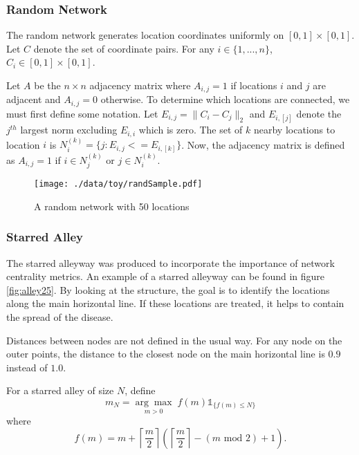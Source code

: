 \documentclass[11pt]{article}
\begin{document}
\subsubsection{Random Network}
\label{sec-2-1-1}

The random network generates location coordinates uniformly on $[0,1]
\times [0,1]$.  Let $C$ denote the set of coordinate pairs.  For any
$i \in \lbrace 1,...,n \rbrace$, $C_{i} \in [0,1] \times [0,1]$.

Let $A$ be the $n \times n$ adjacency matrix where $A_{i,j} = 1$ if
locations $i$ and $j$ are adjacent and $A_{i,j} = 0$ otherwise.  To
determine which locations are connected, we must first define some
notation.  Let $E_{i,j} = \|C_{i} - C_{j}\|_2$ and $E_{i,[j]}$ denote
the $j^{th}$ largest norm excluding $E_{i,i}$ which is zero.  The set
of $k$ nearby locations to location $i$ is $N^{(k)}_i = \lbrace j :
E_{i,j} <= E_{i,[k]} \rbrace$.  Now, the adjacency matrix is defined
as $A_{i,j} = 1$ if $i \in N_{j}^{(k)}$ or $j \in N_{i}^{(k)}$.


\begin{figure}[htb]
\centering
\texttt{[image: ./data/toy/randSample.pdf]}
\caption{\label{fig:rand25}A random network with 50 locations}
\end{figure}



\subsubsection{Starred Alley}
\label{sec-2-1-2}

The starred alleyway was produced to incorporate the importance of
network centrality metrics.  An example of a starred alleyway can be
found in figure \ref{fig:alley25}.  By looking at the structure, the goal is
to identify the locations along the main horizontal line.  If these
locations are treated, it helps to contain the spread of the disease.

Distances between nodes are not defined in the usual way.  For any
node on the outer points, the distance to the closest node on the main
horizontal line is $0.9$ instead of $1.0$.

For a starred alley of size $N$, define
\begin{equation*}
  m_N = \underset{m > 0}{\arg\max} \; f(m) \mathds{1}_{\lbrace f(m) \le N
    \rbrace }
\end{equation*}
where
\begin{equation*}
  f(m) = m + \left\lceil \frac{m}{2}
  \right\rceil 
  \left(\left\lceil \frac{m}{2} \right\rceil
    - (m \text{ mod } 2) + 1 \right).
\end{equation*}
\end{document}
